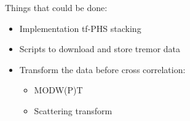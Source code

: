 \documentclass[main.tex]{subfiles}
\begin{document}
Things that could be done:

\begin{itemize}
	\item Implementation tf-PHS stacking
	\item Scripts to download and store tremor data
	\item Transform the data before cross correlation:
	\begin{itemize}
		\item MODW(P)T
		\item Scattering transform
	\end{itemize}
\end{itemize}
\end{document}
